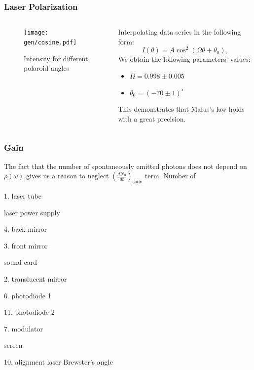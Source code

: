 \documentclass{beamer}
\begin{document}
	
	\begin{frame}
		\frametitle{Laser Polarization}
		
		\begin{columns}
			\begin{column}{0.6\textwidth}
				\begin{figure}
					\centering
					\texttt{[image: gen/cosine.pdf]}
					\caption{Intensity for different polaroid angles}
				\end{figure}
			\end{column}
			\begin{column}{0.4\textwidth}
				Interpolating data series in the following form:
				$$I(\theta) = A \cos^2{(\Omega \theta + \theta_0)},$$
				We obtain the following parameters' values: 
				
				\begin{itemize}
					\item[] $\Omega = 0.998 \pm 0.005$
					\item[] $\theta_0 = (-70 \pm 1)^\circ$
				\end{itemize}
			
			This demonstrates that Malus's law holds with a great precision.
			\end{column}
		\end{columns}
		
		
	\end{frame}
	
	
	
	\begin{frame}
		\frametitle{Gain}
		The fact that the number of spontaneously emitted photons does not depend on  $\rho(\omega)$ gives us a reason to neglect $\left(\frac{dN_0}{dt}\right)_{\text{spon}}$ term. Number of 
		
		1. laser tube
		
		laser power supply
		
		4. back mirror
		
		3. front mirror
		
		sound card
		
		2. translucent mirror
		
		6. photodiode 1
		
		11. photodiode 2
		
		7. modulator
		
		screen
		
		10. alignment laser
		Brewster's angle
	
	
	
	\end{frame}
	
\end{document}

